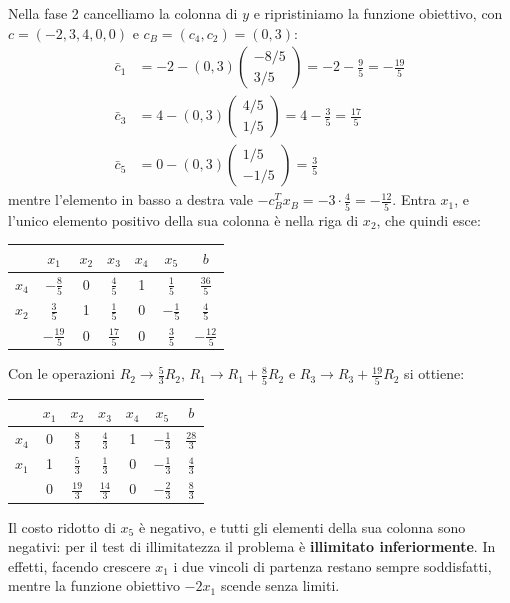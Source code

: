 Nella fase 2 cancelliamo la colonna di $y$ e ripristiniamo la funzione obiettivo, con $c = (-2, 3, 4, 0, 0)$ e $c_B = (c_4, c_2) = (0, 3)$:
\[
\begin{aligned}
\bar{c}_1 &= -2 - (0, 3) \begin{pmatrix} -8/5 \\ 3/5 \end{pmatrix} = -2 - \frac95 = -\frac{19}{5} \\
\bar{c}_3 &= 4 - (0, 3) \begin{pmatrix} 4/5 \\ 1/5 \end{pmatrix} = 4 - \frac35 = \frac{17}{5} \\
\bar{c}_5 &= 0 - (0, 3) \begin{pmatrix} 1/5 \\ -1/5 \end{pmatrix} = \frac35
\end{aligned}
\]
mentre l'elemento in basso a destra vale $-c_B^T x_B = -3 \cdot \frac45 = -\frac{12}{5}$. Entra $x_1$, e l'unico elemento positivo della sua colonna è nella riga di $x_2$, che quindi esce:
\begin{center}
\begin{tabular}{c|ccccc|c}
 & $x_1$ & $x_2$ & $x_3$ & $x_4$ & $x_5$ & $b$ \\
\hline
$x_4$ & $-\frac85$ & 0 & $\frac45$ & 1 & $\frac15$ & $\frac{36}{5}$ \\
$x_2$ & $\boxed{\tfrac35}$ & 1 & $\frac15$ & 0 & $-\frac15$ & $\frac45$ \\
\hline
 & $-\frac{19}{5}$ & 0 & $\frac{17}{5}$ & 0 & $\frac35$ & $-\frac{12}{5}$ \\
\end{tabular}
\end{center}
Con le operazioni $R_2 \to \frac53 R_2$, $R_1 \to R_1 + \frac85 R_2$ e $R_3 \to R_3 + \frac{19}{5} R_2$ si ottiene:
\begin{center}
\begin{tabular}{c|ccccc|c}
 & $x_1$ & $x_2$ & $x_3$ & $x_4$ & $x_5$ & $b$ \\
\hline
$x_4$ & 0 & $\frac83$ & $\frac43$ & 1 & $-\frac13$ & $\frac{28}{3}$ \\
$x_1$ & 1 & $\frac53$ & $\frac13$ & 0 & $-\frac13$ & $\frac43$ \\
\hline
 & 0 & $\frac{19}{3}$ & $\frac{14}{3}$ & 0 & $-\frac23$ & $\frac83$ \\
\end{tabular}
\end{center}
Il costo ridotto di $x_5$ è negativo, e tutti gli elementi della sua colonna sono negativi: per il test di illimitatezza il problema è \textbf{illimitato inferiormente}. In effetti, facendo crescere $x_1$ i due vincoli di partenza restano sempre soddisfatti, mentre la funzione obiettivo $-2x_1$ scende senza limiti.

